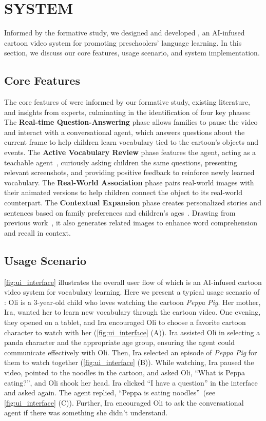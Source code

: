 \section{\name{} SYSTEM}
Informed by the formative study, we designed and developed \name, an AI-infused cartoon video system for promoting preschoolers' language learning. In this section, we discuss our core features, usage scenario, and system implementation.
\subsection{Core Features}
The core features of \name{} were informed by our formative study, existing literature, and insights from experts, culminating in the identification of four key phases: 
The \textbf{Real-time Question-Answering} phase allows families to pause the video and interact with a conversational agent, which answers questions about the current frame to help children learn vocabulary tied to the cartoon's objects and events.
The \textbf{Active Vocabulary Review} phase features the agent, acting as a teachable agent~\cite{matsuda2020effect}, curiously asking children the same questions, presenting relevant screenshots, and providing positive feedback to reinforce newly learned vocabulary.
The \textbf{Real-World Association} phase pairs real-world images with their animated versions to help children connect the object to its real-world counterpart.
The \textbf{Contextual Expansion} phase creates personalized stories and sentences based on family preferences and children's ages~\cite{leong2024putting}. Drawing from previous work~\cite{chen2024retassist}, it also generates related images to enhance word comprehension and recall in context.


\subsection{\name{} Usage Scenario}
\autoref{fig:ui_interface} illustrates the overall user flow of \name{} which is an AI-infused cartoon video system for vocabulary learning. Here we present a typical usage scenario of \name{}: 
Oli is a 3-year-old child who loves watching the cartoon \textit{Peppa Pig}. 
Her mother, Ira, wanted her to learn new vocabulary through the cartoon video. 
One evening, they opened \name{} on a tablet, and Ira encouraged Oli to choose a favorite cartoon character to watch with her (\autoref{fig:ui_interface} (A)). 
Ira assisted Oli in selecting a panda character and the appropriate age group, ensuring the agent could communicate effectively with Oli. 
Then, Ira selected an episode of \textit{Peppa Pig} for them to watch together (\autoref{fig:ui_interface} (B)). 
While watching, Ira paused the video, pointed to the noodles in the cartoon, and asked Oli, ``What is Peppa eating?'', and Oli shook her head.
Ira clicked ``I have a question'' in the interface and asked again. The agent replied, ``Peppa is eating noodles''~(see \autoref{fig:ui_interface} (C)).
Further, Ira encouraged Oli to ask the conversational agent if there was something she didn't understand. 

